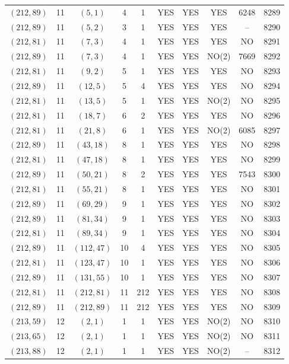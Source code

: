 \begin{longtable}{|c|c|c|c|c|c|c|c|c|c|}
$(212, 89)$ & 11 & $(5, 1)$ & 4 & 1 & YES & YES & YES & 6248 & 8289\\
$(212, 89)$ & 11 & $(5, 2)$ & 3 & 1 & YES & YES & YES & -- & 8290\\
$(212, 81)$ & 11 & $(7, 3)$ & 4 & 1 & YES & YES & YES & NO & 8291\\
$(212, 89)$ & 11 & $(7, 3)$ & 4 & 1 & YES & YES & NO(2) & 7669 & 8292\\
$(212, 81)$ & 11 & $(9, 2)$ & 5 & 1 & YES & YES & YES & NO & 8293\\
$(212, 89)$ & 11 & $(12, 5)$ & 5 & 4 & YES & YES & YES & NO & 8294\\
$(212, 81)$ & 11 & $(13, 5)$ & 5 & 1 & YES & YES & NO(2) & NO & 8295\\
$(212, 81)$ & 11 & $(18, 7)$ & 6 & 2 & YES & YES & YES & NO & 8296\\
$(212, 81)$ & 11 & $(21, 8)$ & 6 & 1 & YES & YES & NO(2) & 6085 & 8297\\
$(212, 89)$ & 11 & $(43, 18)$ & 8 & 1 & YES & YES & YES & NO & 8298\\
$(212, 81)$ & 11 & $(47, 18)$ & 8 & 1 & YES & YES & YES & NO & 8299\\
$(212, 89)$ & 11 & $(50, 21)$ & 8 & 2 & YES & YES & YES & 7543 & 8300\\
$(212, 81)$ & 11 & $(55, 21)$ & 8 & 1 & YES & YES & YES & NO & 8301\\
$(212, 89)$ & 11 & $(69, 29)$ & 9 & 1 & YES & YES & YES & NO & 8302\\
$(212, 89)$ & 11 & $(81, 34)$ & 9 & 1 & YES & YES & YES & NO & 8303\\
$(212, 81)$ & 11 & $(89, 34)$ & 9 & 1 & YES & YES & YES & NO & 8304\\
$(212, 89)$ & 11 & $(112, 47)$ & 10 & 4 & YES & YES & YES & NO & 8305\\
$(212, 81)$ & 11 & $(123, 47)$ & 10 & 1 & YES & YES & YES & NO & 8306\\
$(212, 89)$ & 11 & $(131, 55)$ & 10 & 1 & YES & YES & YES & NO & 8307\\
$(212, 81)$ & 11 & $(212, 81)$ & 11 & 212 & YES & YES & YES & NO & 8308\\
$(212, 89)$ & 11 & $(212, 89)$ & 11 & 212 & YES & YES & YES & NO & 8309\\
$(213, 59)$ & 12 & $(2, 1)$ & 1 & 1 & YES & YES & NO(2) & NO & 8310\\
$(213, 65)$ & 12 & $(2, 1)$ & 1 & 1 & YES & YES & NO(2) & NO & 8311\\
$(213, 88)$ & 12 & $(2, 1)$ & 1 & 1 & YES & YES & NO(2) & -- & 8312\\

\end{longtable}
